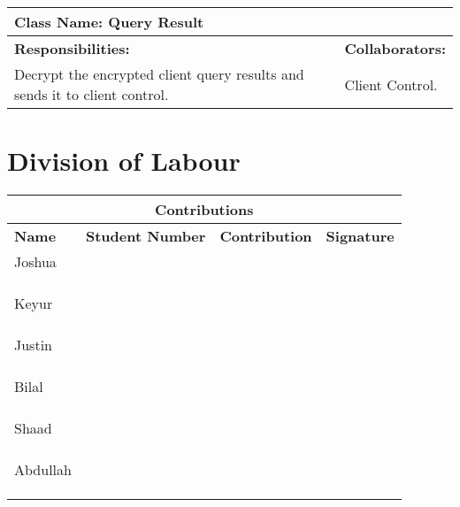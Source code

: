 \documentclass[]{article}
\begin{document}
\begin{enumerate}[a)]
\begin{table}[ht]
\begin{tabular}{|p{5cm}|p{5cm}|}
		\hline				
		\end{tabular}
	\end{table}

\begin{table}[ht]
		\centering
		\begin{tabular}{|p{5cm}|p{5cm}|}
		\hline 
		 \multicolumn{2}{|l|}{\textbf{Class Name: Query Result}} \\
		\hline
		\textbf{Responsibilities: } & \textbf{Collaborators:} \\
		\hline
		Decrypt the encrypted client query results and sends it to client control.
		\vspace{1in} & Client Control.\\
		
		\hline				
		\end{tabular}
	\end{table}
\end{enumerate}

\newpage
\clearpage
\appendix
\section{Division of Labour} \label{dlabour}
\begin{tabular}{ |p{3cm}||p{2cm}|p{6cm}|p{1.5cm}|  }
 \hline
 \multicolumn{4}{|c|}{Contributions} \\
 \hline
 \textbf{Name}& \textbf{Student Number}& \textbf{Contribution}& \textbf{Signature}\\
 \hline
 Joshua &     &&   \\ 
 &&&   \\
 &&&   \\
 &&&   \\
 \hline
 Keyur  &    &  &\\
 &&&   \\
 &&&   \\
 &&&   \\
 \hline
 Justin &&& \\
 &&&   \\
 &&&   \\
 &&&   \\
 \hline
 Bilal & & & \\
 &&&   \\
 &&&   \\
 &&&   \\
 \hline
 Shaad &  & &\\
 &&&   \\
 &&&   \\
 &&&   \\
 \hline
 Abdullah & &  &\\
 &&&   \\
 &&&   \\
 &&&   \\
 \hline
\end{tabular}
\end{document}
